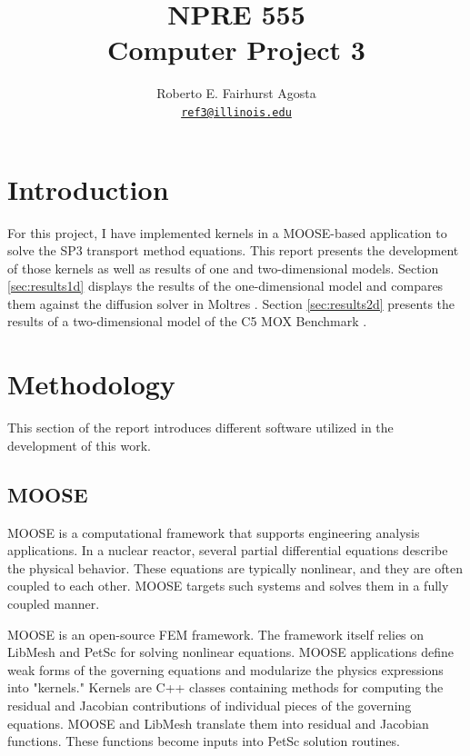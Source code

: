 \documentclass[letterpaper]{article}
\author{Roberto E. Fairhurst Agosta
        \\ \href{mailto:ref3@illinois.edu}{\texttt{ref3@illinois.edu}}
}
\title{NPRE 555\\ Computer Project 3}
\begin{document}
\begin{titlepage}
\maketitle
\thispagestyle{empty}
\end{titlepage}

\section{Introduction}

For this project, I have implemented kernels in a MOOSE-based application to solve the SP3 transport method equations.
This report presents the development of those kernels as well as results of one and two-dimensional models.
Section \ref{sec:results1d} displays the results of the one-dimensional model and compares them against the diffusion solver in Moltres \cite{lindsay_introduction_2018}.
Section \ref{sec:results2d} presents the results of a two-dimensional model of the C5 MOX Benchmark \cite{capilla_applications_2009}.

\section{Methodology}

This section of the report introduces different software utilized in the development of this work.

\subsection{MOOSE}

MOOSE \cite{gaston_moose_2009} is a computational framework that supports engineering analysis applications.
In a nuclear reactor, several partial differential equations describe the physical behavior.
These equations are typically nonlinear, and they are often coupled to each other.
\gls{MOOSE} targets such systems and solves them in a fully coupled manner.

\gls{MOOSE} is an open-source FEM framework.
The framework itself relies on LibMesh \cite{kirk_libmesh_2006} and PetSc \cite{balay_petsc_2016} for solving nonlinear equations.
MOOSE applications define weak forms of the governing equations and modularize the physics expressions into "kernels."
Kernels are C++ classes containing methods for computing the residual and Jacobian contributions of individual pieces of the governing equations.
\gls{MOOSE} and LibMesh translate them into residual and Jacobian functions.
These functions become inputs into PetSc solution routines.
\end{document}

